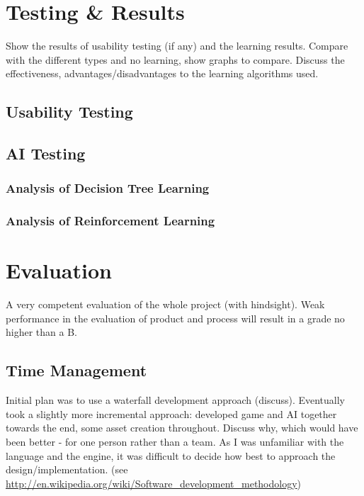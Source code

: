 \documentclass[a4paper,oneside]{report}
\begin{document}
\chapter{Testing \& Results}

Show the results of usability testing (if any) and the learning results. Compare with the different types and no learning, show graphs to compare. Discuss the effectiveness, advantages/disadvantages to the learning algorithms used.

\section{Usability Testing}

\section{AI Testing}

\subsection{Analysis of Decision Tree Learning}
\subsection{Analysis of Reinforcement Learning}



%
%

\chapter{Evaluation}

A very competent evaluation of the whole project (with hindsight). Weak performance in the evaluation of product and process will result in a grade no higher than a B.

\section{Time Management}

Initial plan was to use a waterfall development approach (discuss). Eventually took a slightly more incremental approach: developed game and AI together towards the end, some asset creation throughout. Discuss why, which would have been better - for one person rather than a team. As I was unfamiliar with the language and the engine, it was difficult to decide how best to approach the design/implementation. (see \url{http://en.wikipedia.org/wiki/Software_development_methodology})
		
\end{document}
